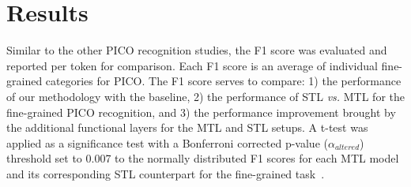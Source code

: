 \documentclass[runningheads]{llncs}
\begin{document}
\section{Results}
\label{sec:results}
%
Similar to the other PICO recognition studies, the F1 score was evaluated and reported per token for comparison.
Each F1 score is an average of individual fine-grained categories for PICO.
The F1 score serves to compare: 1) the performance of our methodology with the baseline,
2) the performance of STL \textit{vs.} MTL for the fine-grained PICO recognition, and
3) the performance improvement brought by the additional functional layers for the MTL and STL setups.
A t-test was applied as a significance test with a Bonferroni corrected p-value ($\alpha_{altered}$) threshold set to 0.007 to the normally distributed F1 scores for each MTL model and its corresponding STL counterpart for the fine-grained task~\cite{dror2018hitchhiker,fuhr2018some}.
%
\begingroup
\setlength{\tabcolsep}{4pt} %
\renewcommand{\arraystretch}{1.0}
\end{document}
